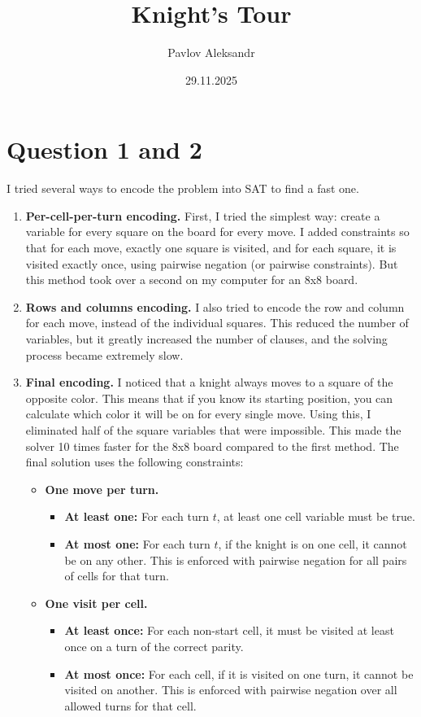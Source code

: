 \documentclass[a4paper, 11pt, oneside]{article}
\title{Knight's Tour}
\author{Pavlov Aleksandr}
\date{29.11.2025}
\begin{document}
\maketitle

\section{Question 1 and 2}
I tried several ways to encode the problem into SAT to find a fast one.
\begin{enumerate}
\item \textbf{Per-cell-per-turn encoding.}
First, I tried the simplest way: create a variable for every square on the board for every move.
I added constraints so that for each move, exactly one square is visited,
and for each square, it is visited exactly once,
using pairwise negation (or pairwise constraints).
But this method took over a second on my computer for an 8x8 board.
\item \textbf{Rows and columns encoding.}
I also tried to encode the row and column for each move, instead of the individual squares.
This reduced the number of variables, but it greatly increased the number of clauses,
and the solving process became extremely slow.
\item \textbf{Final encoding.}
I noticed that a knight always moves to a square of the opposite color.
This means that if you know its starting position,
you can calculate which color it will be on for every single move.
Using this, I eliminated half of the square variables that were impossible.
This made the solver 10 times faster for the 8x8 board compared to the first method.
The final solution uses the following constraints:
\begin{itemize}
    \item \textbf{One move per turn.}
    \begin{itemize}
        \item \textbf{At least one:}
        For each turn $t$, at least one cell variable must be true.
        \item \textbf{At most one:}
        For each turn $t$, if the knight is on one cell, it cannot be on any other.
        This is enforced with pairwise negation for all pairs of cells for that turn.
    \end{itemize}

    \item \textbf{One visit per cell.}
    \begin{itemize}
        \item \textbf{At least once:}
        For each non-start cell, it must be visited at least once on a turn of the correct parity.
        \item \textbf{At most once:}
        For each cell, if it is visited on one turn, it cannot be visited on another.
        This is enforced with pairwise negation over all allowed turns for that cell.
    \end{itemize}


\end{itemize}
\end{enumerate}
\end{document}
